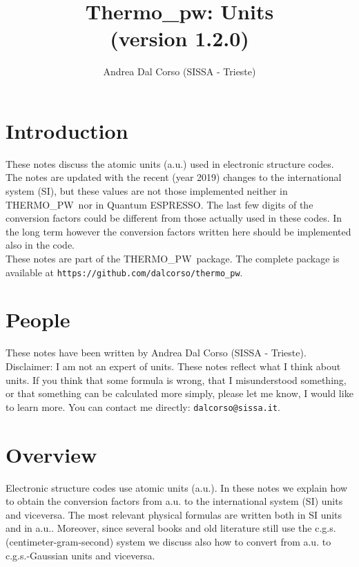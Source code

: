 \documentclass[12pt,a4paper]{article}
\def\version{1.2.0}
\def\qe{{\sc Quantum ESPRESSO}}
\def\tpw{{\sc THERMO\_PW}}
\begin{document}
 
\author{Andrea Dal Corso (SISSA - Trieste)}
\date{}


\title{
  \vskip 1cm
  {\color{red} \Huge Thermo\_pw: Units} \\
  \Large (version \version)
}

\maketitle

\newpage

\tableofcontents

\newpage

\section{\color{coral}Introduction}
These notes discuss the atomic units (a.u.) used in 
electronic structure codes. The notes are updated with the recent 
(year 2019) changes to the international system (SI), but these  
values are not those implemented neither in \tpw\ nor in \qe. The 
last few digits of the conversion factors could be different from 
those actually used in these codes. In the long term however the 
conversion factors written here should be implemented also in the code. \\
These notes are part of the \tpw\ package. The complete package is
available at \texttt{https://github.com/dalcorso/thermo\_pw}.

\newpage
\section{\color{coral}People}
These notes have been written by Andrea Dal Corso (SISSA - Trieste). \\
Disclaimer: I am not an expert of units. 
These notes reflect what I think about units.
If you think that some formula is wrong, that I misunderstood something, or 
that something can be calculated more simply, please let me know, I would 
like to learn more. 
You can contact me directly: \texttt{dalcorso@sissa.it}. 

\newpage
\section{\color{coral}Overview}
Electronic structure codes use atomic units (a.u.). 
In these notes we explain how to obtain the conversion factors 
from a.u. to the international system (SI) units and viceversa. 
The most relevant physical formulas are written both in SI units 
and in a.u.. Moreover, since several books and old literature still 
use the c.g.s. (centimeter-gram-second) system we discuss also how 
to convert from a.u. to c.g.s.-Gaussian units and viceversa.
\end{document}
